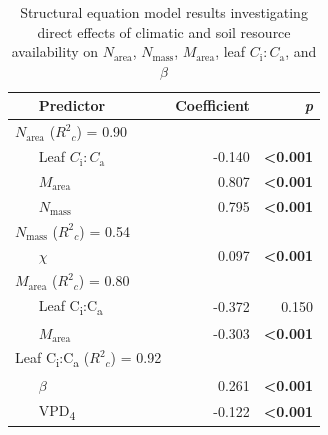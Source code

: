 \newpage
\begin{table}
    \centering
    \caption{Structural equation model results investigating direct effects of climatic and soil resource availability on $N_\mathrm{area}$, $N_\mathrm{mass}$, $M_\mathrm{area}$, leaf $C_\mathrm{i}\mathrm{:}C_\mathrm{a}$, and $\beta$}
        \begin{tabular}{p{0.5cm}p{3cm}p{1.5cm}p{1.5cm}}
            \hline
            & Predictor & \multicolumn{1}{r}{Coefficient} & \multicolumn{1}{r}{\textit{p}} \\
            \hline

            \multicolumn{2}{l}{$N_\mathrm{area}$ ($R^2{}_c$) = 0.90} && \\
            & \multicolumn{1}{l}{Leaf $C_\mathrm{i}\mathrm{:}C_\mathrm{a}$} & \multicolumn{1}{r}{-0.140} & \multicolumn{1}{r}{\textbf{<0.001}} \\
            & \multicolumn{1}{l}{$M_\mathrm{area}$} & \multicolumn{1}{r}{0.807} & \multicolumn{1}{r}{\textbf{<0.001}} \\
            & \multicolumn{1}{l}{$N_\mathrm{mass}$} & \multicolumn{1}{r}{0.795} & \multicolumn{1}{r}{\textbf{<0.001}} \\
            \hline

            \multicolumn{2}{l}{$N_\mathrm{mass}$ ($R^2{}_c$) = 0.54} && \\
            & \multicolumn{1}{l}{$\chi$} & \multicolumn{1}{r}{0.097} & \multicolumn{1}{r}{\textbf{<0.001}} \\
            \hline

            \multicolumn{2}{l}{$M_\mathrm{area}$ ($R^2{}_c$) = 0.80} && \\
            & \multicolumn{1}{l}{Leaf C\textsubscript{i}:C\textsubscript{a}} & \multicolumn{1}{r}{-0.372} & \multicolumn{1}{r}{0.150} \\
            & \multicolumn{1}{l}{$M_\mathrm{area}$} & \multicolumn{1}{r}{-0.303} & \multicolumn{1}{r}{\textbf{<0.001}} \\
            \hline

            \multicolumn{2}{l}{Leaf C\textsubscript{i}:C\textsubscript{a} ($R^2{}_c$) = 0.92} && \\
            & \multicolumn{1}{l}{$\beta$} & \multicolumn{1}{r}{0.261} & \multicolumn{1}{r}{\textbf{<0.001}} \\
            & \multicolumn{1}{l}{VPD\textsubscript{4}} & \multicolumn{1}{r}{-0.122} & \multicolumn{1}{r}{\textbf{<0.001}} \\
            \hline


\end{tabular}
\end{table}
